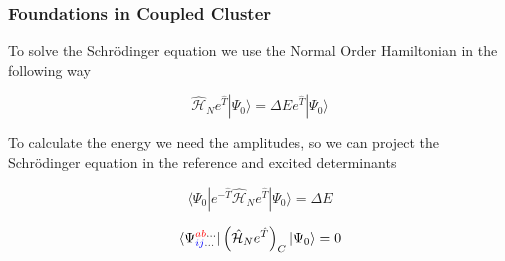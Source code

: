 \documentclass{beamer}
\begin{document}
\begin{frame}
\frametitle{Foundations in Coupled Cluster}
To solve  the Schr\"{o}dinger equation we  use the Normal Order Hamiltonian in the following way

\begin{equation}
   \hat{\mathcal{H}}_{N} e^{\hat{T}} | \Psi_{0} \rangle = \Delta E e^{\hat{T}} | \Psi_{0} \rangle 
\end{equation}

To calculate the energy we need the amplitudes, so we can project the Schr\"{o}dinger equation in the reference and excited determinants 


\[
 \langle \Psi_{0} | e^{-\hat{T}}  \hat{\mathcal{H}}_{N} e^{\hat{T}} | \Psi_{0} \rangle = \Delta E 
\]


\vspace{-10pt}
\[
\langle \Psi^{\textcolor{red}{ab}\ldots}_{\textcolor{blue}{ij}\ldots} |  \left( \hat{\mathcal{H}}_{N} e^{\hat{T}} \right)_{C}| \Psi_{0} \rangle = 0
\]


\end{frame}
\end{document}
